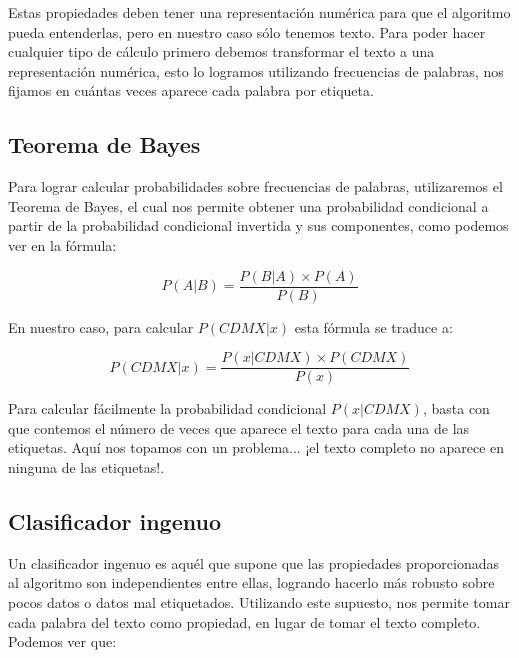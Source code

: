 Estas propiedades deben tener una representación numérica para que el algoritmo pueda entenderlas, pero en nuestro caso sólo tenemos texto. Para poder hacer cualquier tipo de cálculo primero debemos transformar el texto a una representación numérica, esto lo logramos utilizando frecuencias de palabras, nos fijamos en cuántas veces aparece cada palabra por etiqueta.

\subsection{Teorema de Bayes}

Para lograr calcular probabilidades sobre frecuencias de palabras, utilizaremos el Teorema de Bayes, el cual nos permite obtener una probabilidad condicional a partir de la probabilidad condicional invertida y sus componentes, como podemos ver en la fórmula:

\[ P( A | B ) = \frac{P( B | A ) \times P(A)}{P(B)} \]

En nuestro caso, para calcular \(P( CDMX | x )\) esta fórmula se traduce a:

\[ P( CDMX | x ) = \frac{P( x | CDMX ) \times P(CDMX)}{P(x)} \]





Para calcular fácilmente la probabilidad condicional \(P(x | CDMX)\), basta con que contemos el número de veces que aparece el texto  para cada una de las etiquetas. Aquí nos topamos con un problema... ¡el texto completo no aparece en ninguna de las etiquetas!.

\subsection{Clasificador ingenuo}

Un clasificador ingenuo es aquél que supone que las propiedades proporcionadas al algoritmo son independientes entre ellas, logrando hacerlo más robusto sobre pocos datos o datos mal etiquetados.
Utilizando este supuesto, nos permite tomar cada palabra del texto como propiedad, en lugar de tomar el texto completo. Podemos ver que: 

